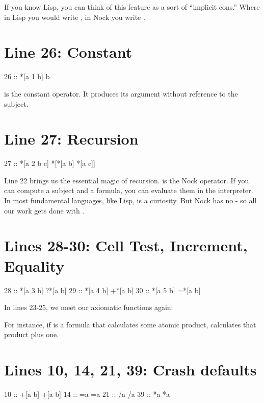 If you know Lisp, you can think of this feature as a sort of ``implicit cons.''
Where in Lisp you would write , in Nock you write \kode{[x y]}.

\section{Line 26: Constant}

\begin{code}
26 ::    *[a 1 b]          b
\end{code}
 is the constant operator.  It produces its argument without
reference to the subject. 

\section{Line 27: Recursion}

\begin{code}
27 ::    *[a 2 b c]        *[*[a b] *[a c]]
\end{code}
Line 22 brings us the essential magic of recursion.   is the Nock operator.
If you can compute a subject and a formula, you can evaluate them in the
interpreter.  In most fundamental languages, like Lisp,  is a curiosity.
But Nock has no  - so all our work gets done with .

\section{Lines 28-30: Cell Test, Increment, Equality}

\begin{code}
28 ::    *[a 3 b]         ?*[a b]
29 ::    *[a 4 b]         +*[a b]
30 ::    *[a 5 b]         =*[a b]
\end{code}
In lines 23-25, we meet our axiomatic functions again:

For instance, if  is a formula that calculates some atomic product, \kode{[4 x]}
calculates that product plus one. 

\section{Lines 10, 14, 21, 39: Crash defaults}

\begin{code}
    10 ::    +[a b]           +[a b]
    14 ::    =a               =a
    21 ::    /a               /a
    39 ::    *a               *a
\end{code}

